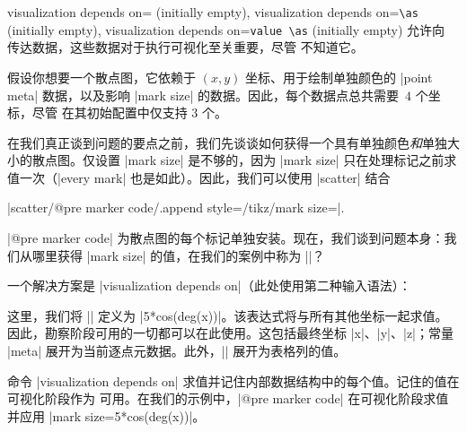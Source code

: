 \begin{pgfplotskeylist}{%
    visualization depends on= (initially empty),%
    visualization depends on=\texttt{\textbackslash as} (initially empty),
    visualization depends on=\texttt{value }\texttt{\textbackslash as} (initially empty)%
}
    允许向 \PGFPlots{} 传达数据，这些数据对于执行可视化至关重要，尽管 \PGFPlots{} 不知道它。

    假设你想要一个散点图，它依赖于 $(x,y)$ 坐标、用于绘制单独颜色的 |point meta| 数据，以及影响 |mark size| 的数据。因此，每个数据点总共需要~$4$ 个坐标，尽管 \PGFPlots{} 在其初始配置中仅支持 $3$ 个。

    在我们真正谈到问题的要点之前，我们先谈谈如何获得一个具有单独颜色\emph{和}单独大小的散点图。仅设置 |mark size| 是不够的，因为 |mark size| 只在处理标记之前求值一次（|every mark| 也是如此）。因此，我们可以使用 |scatter| 结合

    |scatter/@pre marker code/.append style={/tikz/mark size=\perpointmarksize}|.

    \noindent |@pre marker code| 为散点图的每个标记单独安装。现在，我们谈到问题本身：我们从哪里获得 |mark size| 的值，在我们的案例中称为 |\perpointmarksize|？

    一个解决方案是 |visualization depends on|（此处使用第二种输入语法）：
\begin{codeexample}[]
\end{codeexample}

    这里，我们将 |\perpointmarksize| 定义为 |5*cos(deg(x))|。该表达式将与所有其他坐标一起求值。因此，勘察阶段可用的一切都可以在此使用。这包括最终坐标 |x|、|y|、|z|；常量 |meta| 展开为当前逐点元数据。此外，|\thisrow| 展开为表格列的值。

    命令 |visualization depends on| 求值并记住内部数据结构中的每个值。记住的值在可视化阶段作为  可用。在我们的示例中，|@pre marker code| 在可视化阶段求值并应用 |mark size=5*cos(deg(x))|。


\end{pgfplotskeylist}
